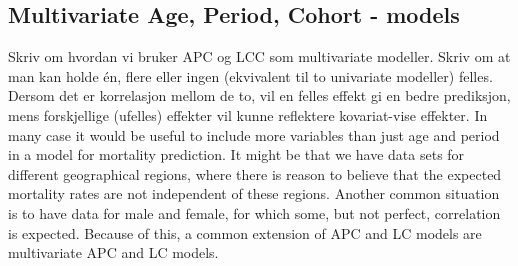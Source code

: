\subsection{Multivariate Age, Period, Cohort - models}
\label{sec:multivariateAPC}
\textcolor{myDarkGreen}{
Skriv om hvordan vi bruker APC og LCC som multivariate modeller. Skriv om at man kan holde én, flere eller ingen (ekvivalent til to univariate modeller) felles. Dersom det er korrelasjon mellom de to, vil en felles effekt gi en bedre prediksjon, mens forskjellige (ufelles) effekter vil kunne reflektere kovariat-vise effekter. 
}
In many case it would be useful to include more variables than just age and period in a model for mortality prediction. It might be that we have data sets for different geographical regions, where there is reason to believe that the expected mortality rates are not independent of these regions. Another common situation is to have data for male and female, for which some, but not perfect, correlation is expected. Because of this, a common extension of APC and LC models are multivariate APC and LC models. 